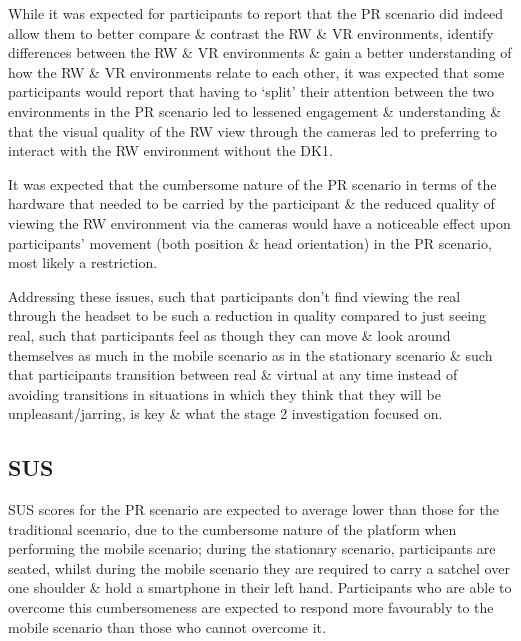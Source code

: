 While it was expected for participants to report that the PR scenario did indeed allow them to better compare \& contrast the RW \& VR environments, identify differences between the RW \& VR environments \& gain a better understanding of how the RW \& VR environments relate to each other, it was expected that some participants would report that having to `split' their attention between the two environments in the PR scenario led to lessened engagement \& understanding \& that the visual quality of the RW view through the cameras led to preferring to interact with the RW environment without the DK1.

It was expected that the cumbersome nature of the PR scenario in terms of the hardware that needed to be carried by the participant \& the reduced quality of viewing the RW environment via the cameras would have a noticeable effect upon participants' movement (both position \& head orientation) in the PR scenario, most likely a restriction.

Addressing these issues, such that participants don't find viewing the real through the headset to be such a reduction in quality compared to just seeing real, such that participants feel as though they can move \& look around themselves as much in the mobile scenario as in the stationary scenario \& such that participants transition between real \& virtual at any time instead of avoiding transitions in situations in which they think that they will be unpleasant/jarring, is key \& what the stage 2 investigation focused on.


\subsection{SUS}
SUS scores for the PR scenario are expected to average lower than those for the traditional scenario, due to the cumbersome nature of the platform when performing the mobile scenario; during the stationary scenario, participants are seated, whilst during the mobile scenario they are required to carry a satchel over one shoulder \& hold a smartphone in their left hand. Participants who are able to overcome this cumbersomeness are expected to respond more favourably to the mobile scenario than those who cannot overcome it.

